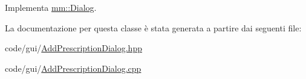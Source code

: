 Implementa \hyperlink{classmm_1_1_dialog_afda4b0dc7c0ac027c4b8fdb95713700f}{mm\+::\+Dialog}.



La documentazione per questa classe è stata generata a partire dai seguenti file\+:\begin{DoxyCompactItemize}
\item 
code/gui/\hyperlink{_add_prescription_dialog_8hpp}{Add\+Prescription\+Dialog.\+hpp}\item 
code/gui/\hyperlink{_add_prescription_dialog_8cpp}{Add\+Prescription\+Dialog.\+cpp}\end{DoxyCompactItemize}
